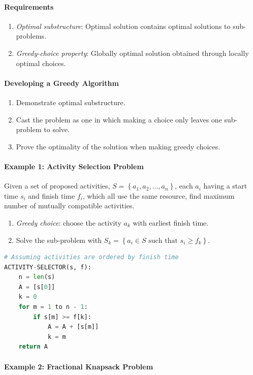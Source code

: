 \documentclass[twocolumn,english]{article}
\numberwithin{equation}{section}
\numberwithin{figure}{section}
\numberwithin{table}{section}
\begin{document}
\paragraph{Requirements}
\begin{enumerate}
\item \emph{Optimal substructure}: Optimal solution contains optimal solutions
to sub-problems.
\item \emph{Greedy-choice property}: Globally optimal solution obtained
through locally optimal choices.
\end{enumerate}

\paragraph{Developing a Greedy Algorithm}
\begin{enumerate}
\item Demonstrate optimal substructure.
\item Cast the problem as one in which making a choice only leaves one sub-problem
to solve.
\item Prove the optimality of the solution when making greedy choices.
\end{enumerate}

\paragraph{Example 1: Activity Selection Problem}

Given a set of proposed activities, $S=\left\{ a_{1},a_{2},\dots,a_{n}\right\} $,
each $a_{i}$ having a start time $s_{i}$ and finish time $f_{i}$,
which all use the same resource, find maximum number of mutually compatible
activities.
\begin{enumerate}
\item \emph{Greedy choice}: choose the activity $a_{k}$ with earliest finish
time.
\item Solve the sub-problem with $S_{k}=\left\{ a_{i}\in S\text{ such that }s_{i}\geq f_{k}\right\} $.
\end{enumerate}
\begin{lstlisting}[language=Python,basicstyle={\footnotesize\ttfamily},tabsize=4,frame=single]
# Assuming activities are ordered by finish time
ACTIVITY-SELECTOR(s, f):
	n = len(s)
	A = [s[0]]
	k = 0
	for m = 1 to n - 1:
		if s[m] >= f[k]:
			A = A + [s[m]]
			k = m
	return A
\end{lstlisting}

\paragraph{Example 2: Fractional Knapsack Problem}
\end{document}
